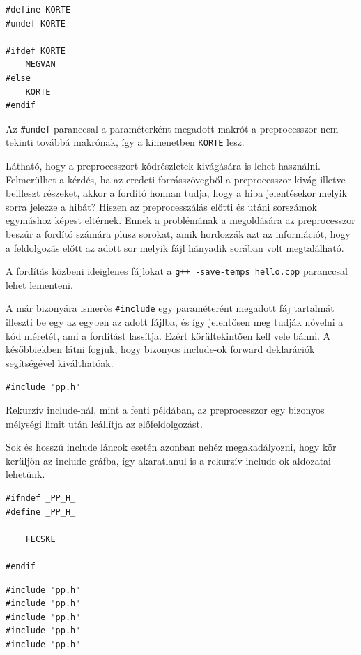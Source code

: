 \documentclass[a4paper,11.5pt,table]{article}
\begin{document}
	\begin{lstlisting}
#define KORTE
#undef KORTE

#ifdef KORTE
	MEGVAN
#else
	KORTE
#endif
	\end{lstlisting}
	Az \texttt{\#undef} paranccsal a paraméterként megadott makrót a preprocesszor nem tekinti továbbá makrónak, így a kimenetben \texttt{KORTE} lesz.
	
	Látható, hogy a preprocesszort kódrészletek kivágására is lehet használni. 
  Felmerülhet a kérdés, ha az eredeti forrásszövegből a preprocesszor kivág illetve beilleszt részeket, akkor a fordító honnan tudja, hogy a hiba jelentésekor melyik sorra jelezze a hibát? Hiszen az preprocesszálás előtti és utáni sorszámok egymáshoz képest eltérnek. Ennek a problémának a megoldására az preprocesszor beszúr a fordító számára plusz sorokat, amik hordozzák azt az információt, hogy a feldolgozás előtt az adott sor melyik fájl hányadik sorában volt megtalálható. 
	\begin{note}
		 A fordítás közbeni ideiglenes fájlokat a \texttt{g++ -save-temps hello.cpp} paranccsal lehet lementeni.
	\end{note}
	A már bizonyára ismerős \texttt{\#include} egy paraméterént megadott fáj tartalmát illeszti be egy az egyben az adott fájlba, és így jelentősen meg tudják növelni a kód méretét, ami a fordítást lassítja. Ezért körültekintően kell vele bánni. A későbbiekben látni fogjuk, hogy bizonyos include-ok forward deklarációk segítségével kiválthatóak.
	\bigskip
	
	\begin{lstlisting}
#include "pp.h"
	\end{lstlisting}
		
	Rekurzív include-nál, mint a fenti példában, az preprocesszor egy bizonyos mélységi limit után leállítja az előfeldolgozást.
	
	Sok és hosszú include láncok esetén azonban nehéz megakadályozni, hogy kör kerüljön az include gráfba, így akaratlanul is a rekurzív include-ok aldozatai lehetünk.
	\bigskip
	
	\begin{lstlisting}
#ifndef _PP_H_
#define _PP_H_

	FECSKE

#endif
	\end{lstlisting}
	
	\begin{lstlisting}
#include "pp.h"
#include "pp.h"
#include "pp.h"
#include "pp.h"
#include "pp.h"
	\end{lstlisting}
	
\end{document}
